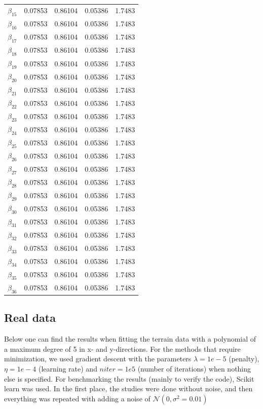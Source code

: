 \begin{table} [H]
\begin{tabularx}{\textwidth}{l|XXXX}
		$\beta_{15}$ & 0.07853 & 0.86104 & 0.05386 & 1.7483\\
		$\beta_{16}$ & 0.07853 & 0.86104 & 0.05386 & 1.7483\\
		$\beta_{17}$ & 0.07853 & 0.86104 & 0.05386 & 1.7483\\
		$\beta_{18}$ & 0.07853 & 0.86104 & 0.05386 & 1.7483\\
		$\beta_{19}$ & 0.07853 & 0.86104 & 0.05386 & 1.7483\\
		$\beta_{20}$ & 0.07853 & 0.86104 & 0.05386 & 1.7483\\
		$\beta_{21}$ & 0.07853 & 0.86104 & 0.05386 & 1.7483\\
		$\beta_{22}$ & 0.07853 & 0.86104 & 0.05386 & 1.7483\\
		$\beta_{23}$ & 0.07853 & 0.86104 & 0.05386 & 1.7483\\
		$\beta_{24}$ & 0.07853 & 0.86104 & 0.05386 & 1.7483\\
		$\beta_{25}$ & 0.07853 & 0.86104 & 0.05386 & 1.7483\\
		$\beta_{26}$ & 0.07853 & 0.86104 & 0.05386 & 1.7483\\
		$\beta_{27}$ & 0.07853 & 0.86104 & 0.05386 & 1.7483\\
		$\beta_{28}$ & 0.07853 & 0.86104 & 0.05386 & 1.7483\\
		$\beta_{29}$ & 0.07853 & 0.86104 & 0.05386 & 1.7483\\
		$\beta_{30}$ & 0.07853 & 0.86104 & 0.05386 & 1.7483\\
		$\beta_{31}$ & 0.07853 & 0.86104 & 0.05386 & 1.7483\\
		$\beta_{32}$ & 0.07853 & 0.86104 & 0.05386 & 1.7483\\
		$\beta_{33}$ & 0.07853 & 0.86104 & 0.05386 & 1.7483\\
		$\beta_{34}$ & 0.07853 & 0.86104 & 0.05386 & 1.7483\\
		$\beta_{35}$ & 0.07853 & 0.86104 & 0.05386 & 1.7483\\
		$\beta_{36}$ & 0.07853 & 0.86104 & 0.05386 & 1.7483\\ \hline
	\end{tabularx}
\end{table}

\subsection{Real data}
Below one can find the results when fitting the terrain data with a polynomial of a maximum degree of 5 in x- and y-directions. For the methods that require minimization, we used gradient descent with the parameters $\lambda=1e-5$ (penalty), $\eta=1e-4$ (learning rate) and $niter=1e5$ (number of iterations) when nothing else is specified. For benchmarking the results (mainly to verify the code), Scikit learn was used. In the first place, the studies were done without noise, and then everything was repeated with adding a noise of $\mathcal{N}(0, \sigma^2=0.01)$


